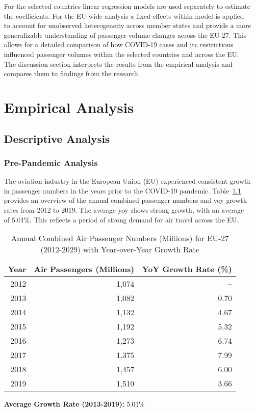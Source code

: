 \documentclass[12pt,onehalfspacing,headsepline,oneside,openright,a4paper, fleqn]{report}
\begin{document}
For the selected countries linear regression models are used separately to estimate the coefficients. For the EU-wide analysis a fixed-effects within model is applied to account for unobserved heterogeneity across member states and provide a more generalizable understanding of passenger volume changes across the EU-27. This allows for a detailed comparison of how COVID-19 cases and \gls{itc} restrictions influenced passenger volumes within the selected countries and across the EU.
\\

The discussion section interprets the results from the empirical analysis and compares them to findings from the research.



\chapter{Empirical Analysis}
\section{Descriptive Analysis}
\label{sec:descriptive_analysis}

\subsection{Pre-Pandemic Analysis}
\label{sec:pre_pandemic}

The aviation industry in the European Union (EU) experienced consistent growth in passenger numbers in the years prior to the COVID-19 pandemic. Table~\ref{tab:eu_numbers} provides an overview of the annual combined passenger numbers and \gls{yoy} growth rates from 2012 to 2019. The average \gls{yoy} shows strong growth, with an average of 5.01\%. This reflects a period of strong demand for air travel across the EU.

\begin{table}[H]
\centering
\caption{Annual Combined Air Passenger Numbers (Millions) for EU-27 (2012-2029) with Year-over-Year Growth Rate}
\label{tab:eu_numbers}
\begin{tabular}{r|r|r}
\toprule
\textbf{Year} & \textbf{Air Passengers (Millions)} & \textbf{YoY Growth Rate (\%)} \\
\midrule
2012 & 1,074 & -- \\
\cmidrule(lr){1-3}
2013 & 1,082 & 0.70 \\
\cmidrule(lr){1-3}
2014 & 1,132 & 4.67 \\
\cmidrule(lr){1-3}
2015 & 1,192 & 5.32 \\
\cmidrule(lr){1-3}
2016 & 1,273 & 6.74 \\
\cmidrule(lr){1-3}
2017 & 1,375 & 7.99 \\
\cmidrule(lr){1-3}
2018 & 1,457 & 6.00 \\
\cmidrule(lr){1-3}
2019 & 1,510 & 3.66 \\
\bottomrule
\end{tabular}
\center \small \textbf{Average Growth Rate (2013-2019):} 5.01\%
\end{table}
\end{document}
